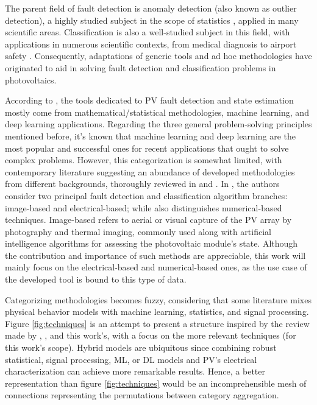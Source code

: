 The parent field of fault detection is anomaly detection (also known as outlier detection), a highly studied subject in the scope of statistics \cite{Prasad2009}, applied in many scientific areas. Classification is also a well-studied subject in this field, with applications in numerous scientific contexts, from medical diagnosis to airport safety \cite{classification}. Consequently, adaptations of generic tools and ad hoc methodologies have originated to aid in solving fault detection and classification problems in photovoltaics.

According to \cite{AIPV}, the tools dedicated to PV fault detection and state estimation mostly come from mathematical/statistical methodologies, machine learning, and deep learning applications. Regarding the three general problem-solving principles mentioned before, it's known that machine learning and deep learning are the most popular and successful ones for recent applications that ought to solve complex problems. However, this categorization is somewhat limited, with contemporary literature suggesting an abundance of developed methodologies from different backgrounds, thoroughly reviewed in \cite{Hong2022} and \cite{Livera2019}. In \cite{Hong2022}, the authors consider two principal fault detection and classification algorithm branches: image-based and electrical-based; while \cite{Livera2019} also distinguishes numerical-based techniques. Image-based refers to aerial or visual capture of the PV array by photography and thermal imaging, commonly used along with artificial intelligence algorithms for assessing the photovoltaic module's state. Although the contribution and importance of such methods are appreciable, this work will mainly focus on the electrical-based and numerical-based ones, as the use case of the developed tool is bound to this type of data.

Categorizing methodologies becomes fuzzy, considering that some literature mixes physical behavior models with machine learning, statistics, and signal processing. Figure \ref{fig:techniques} is an attempt to present a structure inspired by the review made by \cite{Hong2022}, \cite{Livera2019}, and this work's, with a focus on the more relevant techniques (for this work's scope). Hybrid models are ubiquitous since combining robust statistical, signal processing, ML, or DL models and PV's electrical characterization can achieve more remarkable results. Hence, a better representation than figure \ref{fig:techniques} would be an incomprehensible mesh of connections representing the permutations between category aggregation.
 
